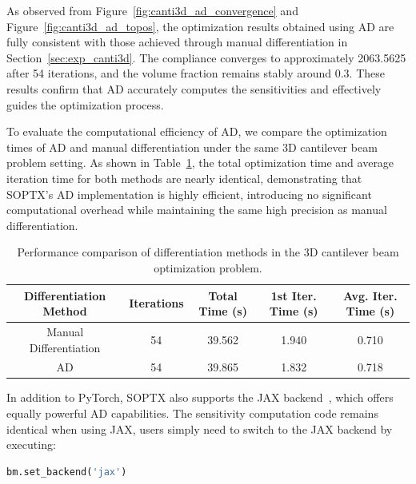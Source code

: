 \documentclass[mathpazo]{cicp}
\begin{document}
As observed from Figure~\ref{fig:canti3d_ad_convergence} and Figure~\ref{fig:canti3d_ad_topos}, the optimization results obtained using AD are fully consistent with those achieved through manual differentiation in Section~\ref{sec:exp_canti3d}. The compliance converges to approximately 2063.5625 after 54 iterations, and the volume fraction remains stably around 0.3. These results confirm that AD accurately computes the sensitivities and effectively guides the optimization process.

To evaluate the computational efficiency of AD, we compare the optimization times of AD and manual differentiation under the same 3D cantilever beam problem setting. As shown in Table~\ref{tab:ad_vs_manual}, the total optimization time and average iteration time for both methods are nearly identical, demonstrating that SOPTX’s AD implementation is highly efficient, introducing no significant computational overhead while maintaining the same high precision as manual differentiation.
\begin{table}[htbp]
	\centering
	\setlength{\tabcolsep}{4pt} %
	\caption{Performance comparison of differentiation methods in the 3D cantilever beam optimization problem.}
	\begin{tabular}{ccccc}
		\toprule
		\textbf{Differentiation Method} & \textbf{Iterations} & \textbf{Total Time (s)} & \textbf{1st Iter. Time (s)} & \textbf{Avg. Iter. Time (s)} \\
		\midrule
		Manual Differentiation & 54 & 39.562 & 1.940 & 0.710 \\
		AD & 54 & 39.865 & 1.832 & 0.718 \\
		\bottomrule
	\end{tabular}
	\label{tab:ad_vs_manual}
\end{table}

In addition to PyTorch, SOPTX also supports the JAX backend~\cite{bradbury2018jax}, which offers equally powerful AD capabilities. The sensitivity computation code remains identical when using JAX, users simply need to switch to the JAX backend by executing:
\begin{lstlisting}[language=python]
bm.set_backend('jax')
\end{lstlisting}
\end{document}
